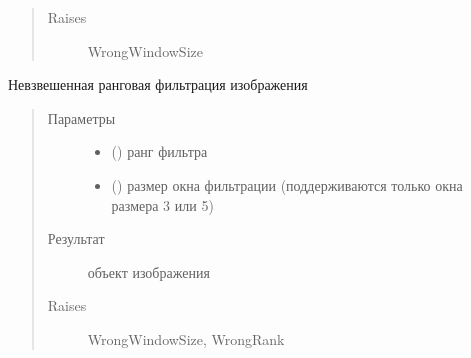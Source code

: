 \documentclass[letterpaper,10pt,russian]{sphinxmanual}
\begin{document}
\begin{fulllineitems}
\begin{fulllineitems}
\begin{quote}
\begin{description}
\item[{Raises}] \leavevmode
WrongWindowSize

\end{description}\end{quote}

\end{fulllineitems}


\begin{fulllineitems}
\label{\detokenize{FilteredImage:FilteredImage.FilteredImage.rank_filter}}
Невзвешенная ранговая фильтрация изображения
\begin{quote}\begin{description}
\item[{Параметры}] \leavevmode\begin{itemize}
\item {} 
 () \textendash{} ранг фильтра

\item {} 
 () \textendash{} размер окна фильтрации (поддерживаются только окна размера 3 или 5)

\end{itemize}

\item[{Результат}] \leavevmode
{\hyperref[\detokenize{BaseImage:core.LabImage}]{}} \textendash{} объект изображения

\item[{Raises}] \leavevmode
WrongWindowSize, WrongRank

\end{description}\end{quote}

\end{fulllineitems}



\end{fulllineitems}
\end{document}

